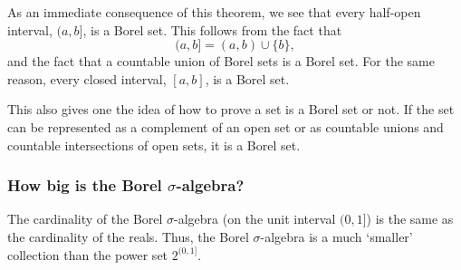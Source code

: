 \begin{corollary}
   As an immediate consequence of this theorem, we see that every half-open interval, $(a, b]$, is a Borel set. This follows from the fact that
   \[
   (a, b] = (a, b) \cup \{b\},
   \]
   and the fact that a countable union of Borel sets is a Borel set. For the same reason, every closed interval, $[a, b]$, is a Borel set.
\end{corollary}

This also gives one the idea of how to prove a set is a Borel set or not. If the set can be represented as a complement of an open set or as countable unions and countable intersections of open sets, it is a Borel set.


\subsubsection{How big is the Borel $\sigma$-algebra?}

\begin{theorem}
   The cardinality of the Borel $\sigma$-algebra (on the unit interval $(0, 1]$) is the same as the cardinality of the reals. Thus, the Borel $\sigma$-algebra is a much ‘smaller’ collection than the power set $2^{(0, 1]}$.
\end{theorem}

